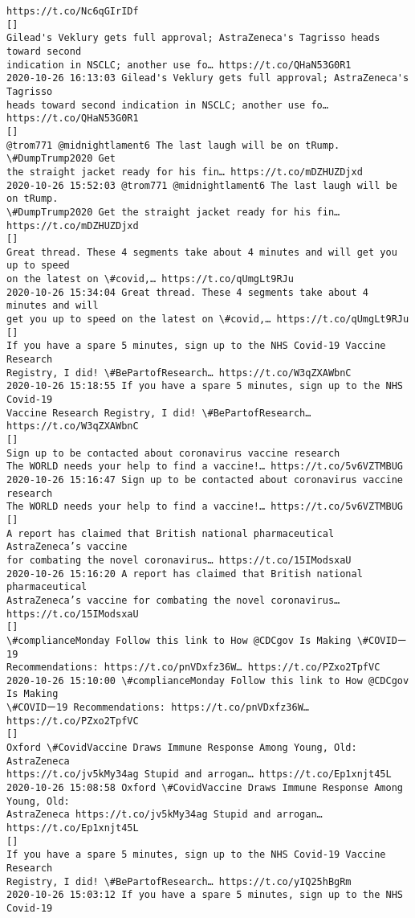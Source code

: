 \documentclass[11pt]{article}
\begin{document}
\begin{Verbatim}[commandchars=\\\{\}]
https://t.co/Nc6qGIrIDf
[]
Gilead's Veklury gets full approval; AstraZeneca's Tagrisso heads toward second
indication in NSCLC; another use fo… https://t.co/QHaN53G0R1
2020-10-26 16:13:03 Gilead's Veklury gets full approval; AstraZeneca's Tagrisso
heads toward second indication in NSCLC; another use fo… https://t.co/QHaN53G0R1
[]
@trom771 @midnightlament6 The last laugh will be on tRump. \#DumpTrump2020 Get
the straight jacket ready for his fin… https://t.co/mDZHUZDjxd
2020-10-26 15:52:03 @trom771 @midnightlament6 The last laugh will be on tRump.
\#DumpTrump2020 Get the straight jacket ready for his fin…
https://t.co/mDZHUZDjxd
[]
Great thread. These 4 segments take about 4 minutes and will get you up to speed
on the latest on \#covid,… https://t.co/qUmgLt9RJu
2020-10-26 15:34:04 Great thread. These 4 segments take about 4 minutes and will
get you up to speed on the latest on \#covid,… https://t.co/qUmgLt9RJu
[]
If you have a spare 5 minutes, sign up to the NHS Covid-19 Vaccine Research
Registry, I did! \#BePartofResearch… https://t.co/W3qZXAWbnC
2020-10-26 15:18:55 If you have a spare 5 minutes, sign up to the NHS Covid-19
Vaccine Research Registry, I did! \#BePartofResearch… https://t.co/W3qZXAWbnC
[]
Sign up to be contacted about coronavirus vaccine research
The WORLD needs your help to find a vaccine!… https://t.co/5v6VZTMBUG
2020-10-26 15:16:47 Sign up to be contacted about coronavirus vaccine research
The WORLD needs your help to find a vaccine!… https://t.co/5v6VZTMBUG
[]
A report has claimed that British national pharmaceutical AstraZeneca’s vaccine
for combating the novel coronavirus… https://t.co/15IModsxaU
2020-10-26 15:16:20 A report has claimed that British national pharmaceutical
AstraZeneca’s vaccine for combating the novel coronavirus…
https://t.co/15IModsxaU
[]
\#complianceMonday Follow this link to How @CDCgov Is Making \#COVIDー19
Recommendations: https://t.co/pnVDxfz36W… https://t.co/PZxo2TpfVC
2020-10-26 15:10:00 \#complianceMonday Follow this link to How @CDCgov Is Making
\#COVIDー19 Recommendations: https://t.co/pnVDxfz36W… https://t.co/PZxo2TpfVC
[]
Oxford \#CovidVaccine Draws Immune Response Among Young, Old: AstraZeneca
https://t.co/jv5kMy34ag Stupid and arrogan… https://t.co/Ep1xnjt45L
2020-10-26 15:08:58 Oxford \#CovidVaccine Draws Immune Response Among Young, Old:
AstraZeneca https://t.co/jv5kMy34ag Stupid and arrogan… https://t.co/Ep1xnjt45L
[]
If you have a spare 5 minutes, sign up to the NHS Covid-19 Vaccine Research
Registry, I did! \#BePartofResearch… https://t.co/yIQ25hBgRm
2020-10-26 15:03:12 If you have a spare 5 minutes, sign up to the NHS Covid-19

\end{Verbatim}
\end{document}

